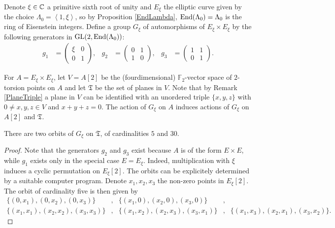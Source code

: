 \begin{definition}
Denote $\xi\in\mathbb{C}$ a primitive sixth root of unity and $E_\xi$ the elliptic curve given by the choice $\Lambda_0 = \left<1,\xi\right>$, so by Proposition \ref{EndLambda}, $\operatorname{End}(\Lambda_0)=\Lambda_0$ is the ring of Eisenstein integers. Define a group $G_\xi$ of automorphisms of $E_\xi\times E_\xi$ by the following generators in $\operatorname{GL}(2,\operatorname{End}(\Lambda_0))$:
\begin{align*}
g_1 &= \left( {\begin{array}{cc}
   \xi & 0 \\       0 & 1      
   \end{array} } \right),
 &
g_2 &= \left( {\begin{array}{cc}
   0 & 1 \\       1 & 0      
   \end{array} } \right),
 &
g_3 &= \left( {\begin{array}{cc}
   1 & 1 \\       0 & 1     
   \end{array} } \right).
\end{align*}
\end{definition}
For $A=E_\xi\times E_\xi$, let $V =A[2]$ be the (fourdimensional) $\mathbb F_2$-vector space of $2$-torsion points on $A$ and let $\mathfrak T$ be the set of planes in $V$. Note that by Remark \ref{PlaneTriple} a plane in $V$ can be identified with an unordered triple $\{x,y,z\}$ with $0\neq x,y,z\in V$ and $x+y+z=0$. The action of $G_\xi$ on $A$ induces actions of $G_\xi$ on $A[2]$ and $\mathfrak T$. 
\begin{lemma}\label{orbitesG}
There are two orbits of $G_\xi$ on $\mathfrak T$, of cardinalities $5$ and $30$.
\end{lemma}
\begin{proof}
Note that the generators $g_2$ and $g_3$ exist because $A$ is of the form $E\times E$, while $g_1$ exists only in the special case $E=E_\xi$. Indeed, multiplication with $\xi$ induces a cyclic permutation on $E_\xi[2]$. 
The orbits can be explicitely determined by a suitable computer program.
Denote $x_1,x_2,x_3$ the non-zero points in $E_\xi[2]$. The orbit of cardinality five is then given by
\begin{align*}
\{(0,x_1),(0,x_2),(0,x_3)\} &,& \{(x_1,0),(x_2,0),(x_3,0)\} &,& \\
\{(x_1,x_1),(x_2,x_2),(x_3,x_3)\} &,& \{(x_1,x_2),(x_2,x_3),(x_3,x_1)\} &,& \{(x_1,x_3),(x_2,x_1),(x_3,x_2)\}.
\end{align*}
\end{proof}

